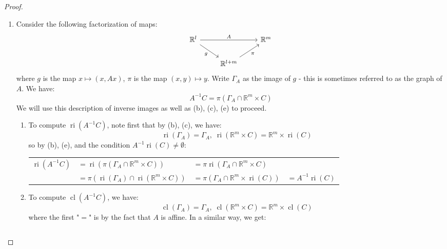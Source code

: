 \begin{proof}
\begin{enumerate}[label=(\alph*)]
\begin{enumerate}[label=(\roman*)]
		      \end{enumerate}
		\item Consider the following factorization of maps:
		      \[
			      \begin{tikzcd}
				      \mathbb{R}^l \arrow[rr,"A"]\arrow[dr,swap,"g"] &&\mathbb{R}^{m}\\
				      &\mathbb{R}^{l+m}\arrow[ru,swap,"\pi"]&
			      \end{tikzcd}
		      \]
		      where $g$ is the map $x\mapsto (x,Ax)$, $\pi$ is the map $(x, y)\mapsto y$. Write $\Gamma_A$ as the image of $g$ - this is sometimes referred to as the graph of $A$. We have:
		      \[
			      A^{-1}C=\pi (\Gamma_A\cap \mathbb{R}^m\times C)
		      \]
		      We will use this description of inverse images as well as (b), (c), (e) to proceed.
		      \begin{enumerate}[label=(\roman*)]
			      \item To compute $\operatorname{ri}(A^{-1}C)$, note first that by (b), (c), we have:
			            \[
				            \operatorname{ri}(\Gamma_A)=\Gamma_A,\; \operatorname{ri}(\mathbb{R}^m\times C)= \mathbb{R}^m \times \operatorname{ri}(C)
			            \]
			            so by (b), (e), and the condition $A^{-1}\operatorname{ri}(C)\neq\emptyset$:
			            \begin{center}
				            \begin{tabular}{llll}
					            $\operatorname{ri}(A^{-1}C)$ & $=\operatorname{ri}(\pi (\Gamma_A\cap \mathbb{R}^m\times C))$                      & $=\pi \operatorname{ri}(\Gamma_A\cap \mathbb{R}^m\times C)$                                     \\
					                                         & $=\pi (\operatorname{ri}( \Gamma_A )\cap \operatorname{ri}(\mathbb{R}^m\times C))$ & $=\pi ( \Gamma_A \cap \mathbb{R}^m\times \operatorname{ri}(C))$ & $=A^{-1}\operatorname{ri}(C)$
				            \end{tabular}
			            \end{center}
			      \item To compute $\operatorname{cl}(A^{-1}C)$, we have:
			            \[
				            \operatorname{cl}(\Gamma_A)=\Gamma_A,\; \operatorname{cl}(\mathbb{R}^m\times C)= \mathbb{R}^m \times \operatorname{cl}(C)
			            \]
			            where the first "$=$" is by the fact that $A$ is affine. In a similar way, we get:
			            \begin{center}
				            \begin{tabular}{llll}

\end{tabular}
\end{center}
\end{enumerate}
\end{enumerate}
\end{proof}

